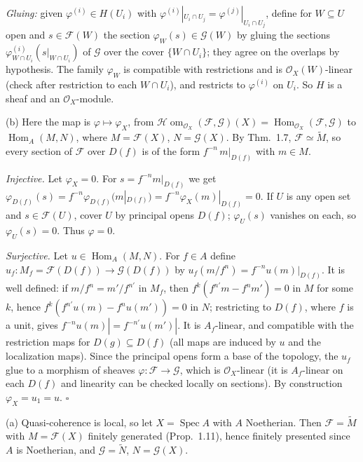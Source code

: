 \documentclass[11pt]{article}
\begin{document}
\emph{Gluing:} given $\varphi^{(i)}\in H(U_i)$ with $\varphi^{(i)}|_{U_i\cap U_j}=\varphi^{(j)}|_{U_i\cap U_j}$, define for $W\subseteq U$ open and $s\in\mathcal{F}(W)$ the section $\varphi_W(s)\in\mathcal{G}(W)$ by gluing the sections $\varphi^{(i)}_{W\cap U_i}(s|_{W\cap U_i})$ of $\mathcal{G}$ over the cover $\{W\cap U_i\}$; they agree on the overlaps by hypothesis. The family $\varphi_W$ is compatible with restrictions and is $\mathcal{O}_X(W)$-linear (check after restriction to each $W\cap U_i$), and restricts to $\varphi^{(i)}$ on $U_i$. So $H$ is a sheaf and an $\mathcal{O}_X$-module.

(b) Here the map is $\varphi\mapsto\varphi_X$, from $\mathcal{H}\!\operatorname{om}_{\mathcal{O}_X}(\mathcal{F},\mathcal{G})(X)=\operatorname{Hom}_{\mathcal{O}_X}(\mathcal{F},\mathcal{G})$ to $\operatorname{Hom}_A(M,N)$, where $M=\mathcal{F}(X)$, $N=\mathcal{G}(X)$. By Thm.~1.7, $\mathcal{F}\simeq\widetilde M$, so every section of $\mathcal{F}$ over $D(f)$ is of the form $f^{-n}\,m|_{D(f)}$ with $m\in M$.

\emph{Injective.} Let $\varphi_X=0$. For $s=f^{-n}m|_{D(f)}$ we get $\varphi_{D(f)}(s)=f^{-n}\varphi_{D(f)}(m|_{D(f)})=f^{-n}\varphi_X(m)|_{D(f)}=0$. If $U$ is any open set and $s\in\mathcal{F}(U)$, cover $U$ by principal opens $D(f)$; $\varphi_U(s)$ vanishes on each, so $\varphi_U(s)=0$. Thus $\varphi=0$.

\emph{Surjective.} Let $u\in\operatorname{Hom}_A(M,N)$. For $f\in A$ define $u_f:M_f=\mathcal{F}(D(f))\to\mathcal{G}(D(f))$ by $u_f(m/f^n)=f^{-n}u(m)|_{D(f)}$. It is well defined: if $m/f^n=m'/f^{n'}$ in $M_f$, then $f^k(f^{n'}m-f^nm')=0$ in $M$ for some $k$, hence $f^k(f^{n'}u(m)-f^nu(m'))=0$ in $N$; restricting to $D(f)$, where $f$ is a unit, gives $f^{-n}u(m)|=f^{-n'}u(m')|$. It is $A_f$-linear, and compatible with the restriction maps for $D(g)\subseteq D(f)$ (all maps are induced by $u$ and the localization maps). Since the principal opens form a base of the topology, the $u_f$ glue to a morphism of sheaves $\varphi:\mathcal{F}\to\mathcal{G}$, which is $\mathcal{O}_X$-linear (it is $A_f$-linear on each $D(f)$ and linearity can be checked locally on sections). By construction $\varphi_X=u_1=u$. \hfill$\square$

\pf
(a) Quasi-coherence is local, so let $X=\operatorname{Spec}A$ with $A$ Noetherian. Then $\mathcal{F}=\widetilde M$ with $M=\mathcal{F}(X)$ finitely generated (Prop.~1.11), hence finitely presented since $A$ is Noetherian, and $\mathcal{G}=\widetilde N$, $N=\mathcal{G}(X)$.
\end{document}

